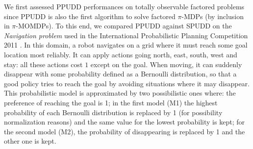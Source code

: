 We first assessed PPUDD performances on totally observable factored problems since PPUDD 
is also the first algorithm to solve factored $\pi$-MDPs (by inclusion in $\pi$-MOMDPs). 
To this end, we compared PPUDD against SPUDD on the \textit{Navigation problem} used in the International Probabilistic Planning
Competition 2011 \cite{SannerIPPC1111}. 
In this domain, a robot navigates on a grid
where it must reach some goal location most reliably. 
It can apply actions going north, east, south, west and stay: 
all these actions cost $1$ except on the goal. 
When moving, it can suddenly disappear with
some probability defined as a Bernoulli distribution, 
so that a good policy
tries to reach the goal by avoiding situations where it may disappear. 
This probabilistic model is approximated by two possibilistic ones where: 
the preference of reaching the goal is 1; in the first model (M1) the highest probability of each Bernoulli
distribution is replaced by 1 (for possibility normalization reasons) and
the same value for the lowest probability is kept; for the second model (M2), the probability of disappearing
is replaced by 1 and the other one is kept. 
